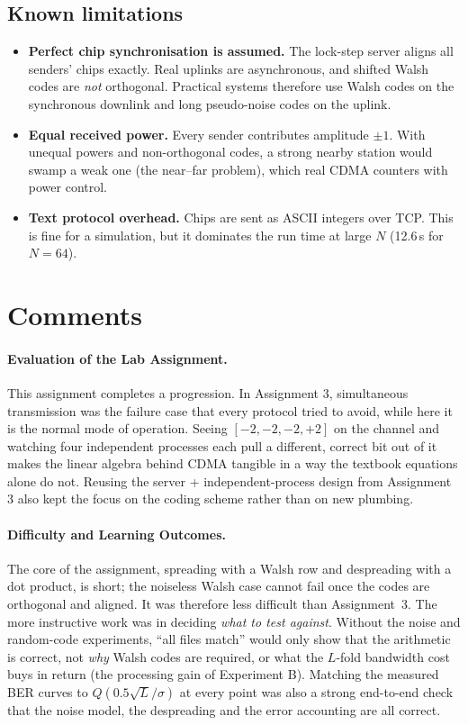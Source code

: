 \documentclass[11pt]{article}
\begin{document}
\subsection{Known limitations}
\begin{itemize}[leftmargin=1.6em]
  \item \textbf{Perfect chip synchronisation is assumed.} The lock-step server aligns all
  senders' chips exactly. Real uplinks are asynchronous, and shifted Walsh codes are
  \emph{not} orthogonal. Practical systems therefore use Walsh codes on the synchronous
  downlink and long pseudo-noise codes on the uplink.
  \item \textbf{Equal received power.} Every sender contributes amplitude $\pm1$. With
  unequal powers and non-orthogonal codes, a strong nearby station would swamp a weak one
  (the near--far problem), which real CDMA counters with power control.
  \item \textbf{Text protocol overhead.} Chips are sent as ASCII integers over TCP. This is
  fine for a simulation, but it dominates the run time at large $N$ (12.6\,s for $N=64$).
\end{itemize}

\section{Comments}

\paragraph{Evaluation of the Lab Assignment.} This assignment completes a progression. In
Assignment 3, simultaneous transmission was the failure case that every protocol tried to
avoid, while here it is the normal mode of operation. Seeing $[-2,-2,-2,+2]$ on the
channel and watching four independent processes each pull a different, correct bit out of
it makes the linear algebra behind CDMA tangible in a way the textbook equations alone do
not. Reusing the server + independent-process design from Assignment 3 also kept the focus
on the coding scheme rather than on new plumbing.

\paragraph{Difficulty and Learning Outcomes.} The core of the assignment, spreading with a
Walsh row and despreading with a dot product, is short; the noiseless Walsh case cannot fail
once the codes are orthogonal and aligned. It was therefore less difficult than
Assignment~3. The more instructive work was in deciding \emph{what to test against}. Without
the noise and random-code experiments, ``all files match'' would only show that the
arithmetic is correct, not \emph{why} Walsh codes are required, or what the $L$-fold
bandwidth cost buys in return (the processing gain of Experiment B). Matching the measured
BER curves to $Q(0.5\sqrt{L}/\sigma)$ at every point was also a strong end-to-end check that
the noise model, the despreading and the error accounting are all correct.
\end{document}
